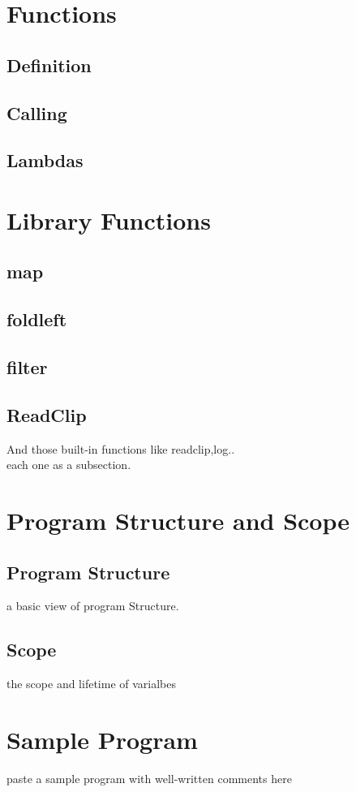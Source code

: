 \documentclass[12pt]{article}
\begin{document}
\section{Functions}
\subsection{Definition}
\subsection{Calling}
\subsection{Lambdas}

\section{Library Functions}
\subsection{map}
\subsection{foldleft}
\subsection{filter}
\subsection{ReadClip}
And those built-in functions like readclip,log..\\ 
each one as a subsection.
\section{Program Structure and Scope}

\subsection{Program Structure}
a basic view of program Structure.\\
\subsection{Scope}
the scope and lifetime of varialbes\\

\section{Sample Program}
paste a sample program with well-written comments here\\
\end{document}
